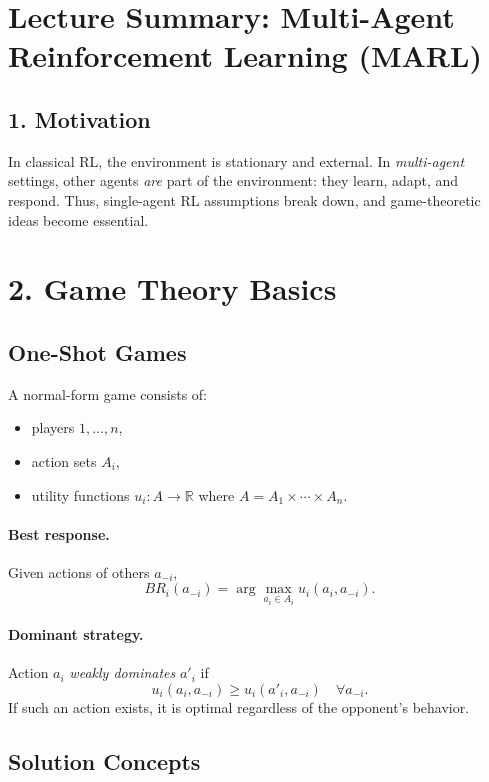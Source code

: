 \documentclass[12pt]{article}
\begin{document}
\psetheader %

\section*{Lecture Summary: Multi-Agent Reinforcement Learning (MARL)}

\subsection*{1. Motivation}
In classical RL, the environment is stationary and external.
In \emph{multi-agent} settings, other agents \emph{are} part of the environment:
they learn, adapt, and respond.
Thus, single-agent RL assumptions break down, and game-theoretic ideas become essential.

\section*{2. Game Theory Basics}

\subsection*{One-Shot Games}
A normal-form game consists of:
\begin{itemize}
		\item players $1,\dots,n$,
		\item action sets $A_i$,
		\item utility functions $u_i: A \to \mathbb{R}$ where $A = A_1 \times \cdots \times A_n$.
\end{itemize}

\paragraph{Best response.}
Given actions of others $a_{-i}$,
\[
		BR_i(a_{-i}) = \arg\max_{a_i \in A_i} u_i(a_i, a_{-i}).
\]

\paragraph{Dominant strategy.}
Action $a_i$ \emph{weakly dominates} $a'_i$ if
\[
		u_i(a_i,a_{-i}) \ge u_i(a'_i,a_{-i}) \quad \forall a_{-i}.
\]
If such an action exists, it is optimal regardless of the opponent’s behavior.

\subsection*{Solution Concepts}
\end{document}
